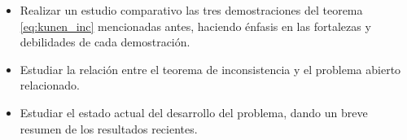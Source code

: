 \documentclass[12pt]{article}
\begin{document}
    \begin{itemize}
        \item Realizar un estudio comparativo las tres demostraciones del teorema \ref{eq:kunen_inc} mencionadas antes,
        haciendo énfasis en las fortalezas y debilidades de cada demostración.
        \item Estudiar la relación entre el teorema de inconsistencia y el problema abierto relacionado.
        \item Estudiar el estado actual del desarrollo del problema, dando un breve resumen de los resultados recientes. 
    \end{itemize}

    \nocite{jech_set_2003}
    \nocite{kanamori_mathematical_1996}
    \singlespacing
    \sloppy
    \printbibliography
\end{document}
